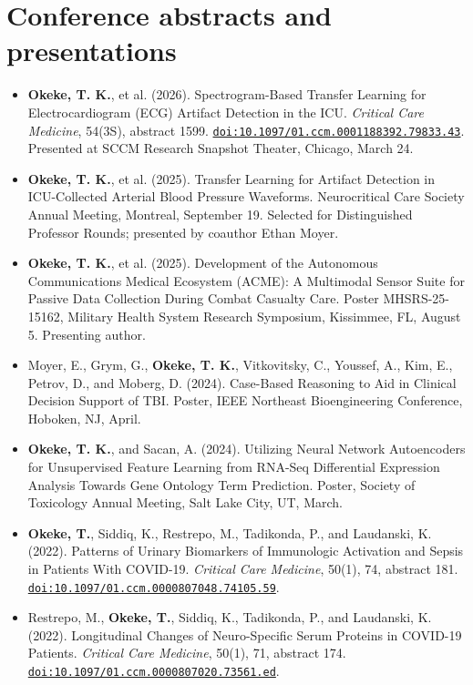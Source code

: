 \documentclass[11pt,letterpaper]{article}
\newcommand{\doi}[1]{\href{https://doi.org/#1}{\nolinkurl{doi:#1}}}
\begin{document}
\section{Conference abstracts and presentations}
\begin{itemize}
\item \textbf{Okeke, T. K.}, et al. (2026). Spectrogram-Based Transfer Learning for Electrocardiogram (ECG) Artifact Detection in the ICU. \textit{Critical Care Medicine}, 54(3S), abstract 1599. \doi{10.1097/01.ccm.0001188392.79833.43}. Presented at SCCM Research Snapshot Theater, Chicago, March 24.
\item \textbf{Okeke, T. K.}, et al. (2025). Transfer Learning for Artifact Detection in ICU-Collected Arterial Blood Pressure Waveforms. Neurocritical Care Society Annual Meeting, Montreal, September 19. Selected for Distinguished Professor Rounds; presented by coauthor Ethan Moyer.
\item \textbf{Okeke, T. K.}, et al. (2025). Development of the Autonomous Communications Medical Ecosystem (ACME): A Multimodal Sensor Suite for Passive Data Collection During Combat Casualty Care. Poster MHSRS-25-15162, Military Health System Research Symposium, Kissimmee, FL, August 5. Presenting author.
\item Moyer, E., Grym, G., \textbf{Okeke, T. K.}, Vitkovitsky, C., Youssef, A., Kim, E., Petrov, D., and Moberg, D. (2024). Case-Based Reasoning to Aid in Clinical Decision Support of TBI. Poster, IEEE Northeast Bioengineering Conference, Hoboken, NJ, April.
\item \textbf{Okeke, T. K.}, and Sacan, A. (2024). Utilizing Neural Network Autoencoders for Unsupervised Feature Learning from RNA-Seq Differential Expression Analysis Towards Gene Ontology Term Prediction. Poster, Society of Toxicology Annual Meeting, Salt Lake City, UT, March.
\item \textbf{Okeke, T.}, Siddiq, K., Restrepo, M., Tadikonda, P., and Laudanski, K. (2022). Patterns of Urinary Biomarkers of Immunologic Activation and Sepsis in Patients With COVID-19. \textit{Critical Care Medicine}, 50(1), 74, abstract 181. \doi{10.1097/01.ccm.0000807048.74105.59}.
\item Restrepo, M., \textbf{Okeke, T.}, Siddiq, K., Tadikonda, P., and Laudanski, K. (2022). Longitudinal Changes of Neuro-Specific Serum Proteins in COVID-19 Patients. \textit{Critical Care Medicine}, 50(1), 71, abstract 174. \doi{10.1097/01.ccm.0000807020.73561.ed}.
\end{itemize}
\end{document}
